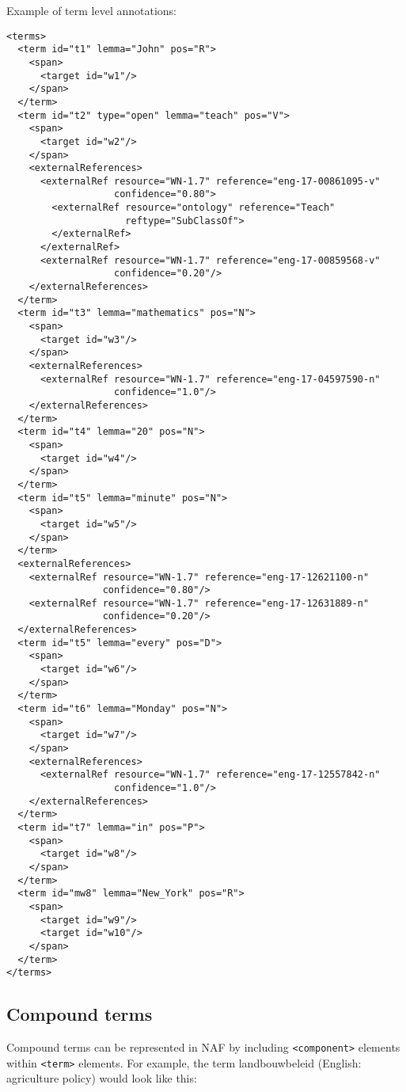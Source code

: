 Example of term level annotations:
\begin{Verbatim}[fontsize=\small]
<terms>
  <term id="t1" lemma="John" pos="R">
    <span>
      <target id="w1"/>
    </span>
  </term>
  <term id="t2" type="open" lemma="teach" pos="V">
    <span>
      <target id="w2"/>
    </span>
    <externalReferences>
      <externalRef resource="WN-1.7" reference="eng-17-00861095-v"
                   confidence="0.80">
        <externalRef resource="ontology" reference="Teach"
                     reftype="SubClassOf">
        </externalRef>
      </externalRef>
      <externalRef resource="WN-1.7" reference="eng-17-00859568-v"
                   confidence="0.20"/>
    </externalReferences>
  </term>
  <term id="t3" lemma="mathematics" pos="N">
    <span>
      <target id="w3"/>
    </span>
    <externalReferences>
      <externalRef resource="WN-1.7" reference="eng-17-04597590-n"
                   confidence="1.0"/>
    </externalReferences>
  </term>
  <term id="t4" lemma="20" pos="N">
    <span>
      <target id="w4"/>
    </span>
  </term>
  <term id="t5" lemma="minute" pos="N">
    <span>
      <target id="w5"/>
    </span>
  </term>
  <externalReferences>
    <externalRef resource="WN-1.7" reference="eng-17-12621100-n"
                 confidence="0.80"/>
    <externalRef resource="WN-1.7" reference="eng-17-12631889-n"
                 confidence="0.20"/>
  </externalReferences>
  <term id="t5" lemma="every" pos="D">
    <span>
      <target id="w6"/>
    </span>
  </term>
  <term id="t6" lemma="Monday" pos="N">
    <span>
      <target id="w7"/>
    </span>
    <externalReferences>
      <externalRef resource="WN-1.7" reference="eng-17-12557842-n"
                   confidence="1.0"/>
    </externalReferences>
  </term>
  <term id="t7" lemma="in" pos="P">
    <span>
      <target id="w8"/>
    </span>
  </term>
  <term id="mw8" lemma="New_York" pos="R">
    <span>
      <target id="w9"/>
      <target id="w10"/>
    </span>
  </term>
</terms>
\end{Verbatim}

\subsection{Compound terms}
\label{sec:compound-terms}

Compound terms can be represented in NAF by including \texttt{<component>}
elements within \texttt{<term>} elements. For example, the term
landbouwbeleid (English: agriculture policy) would look like this:

